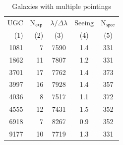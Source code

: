 \begin{table}[t]
\caption{\label{tab:UGC_merge}
Galaxies with multiple pointings}
\centering
%
\begin{tabular}{|r r c c c|}
\hline
  UGC  & N$_{\rm exp}$  & $\lambda/\Delta\lambda$ & Seeing & N$_{\rm spec}$ \\
  (1)  &  (2)   &  (3)   &   (4)    &  (5) \\
\hline
 1081  &      7 &  7590  &   1.4    &  331 \\
 1862  &     11 &  7807  &   1.2    &  331 \\
 3701  &     17 &  7762  &   1.4    &  373 \\
 3997  &     16 &  7928  &   1.4    &  357 \\
 4036  &      8 &  7517  &   1.1    &  372 \\
 4555  &     12 &  7431  &   1.5    &  352 \\
 6918  &      7 &  8267  &   0.9    &  352 \\
 9177  &     10 &  7719  &   1.3    &  331 \\
\hline
\end{tabular}
%
\end{table}

